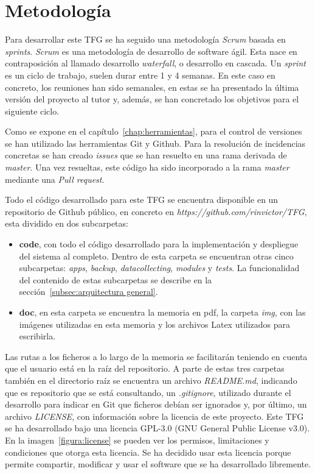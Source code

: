 \documentclass[a4paper, 12pt, oneside]{book}
\begin{document}
\section{Metodología}
\label{sec:Metodología}
Para desarrollar este TFG se ha seguido una metodología \textit{Scrum} basada en \textit{sprints}.
\textit{Scrum} es una metodología de desarrollo de software ágil. Esta nace en contraposición al llamado desarrollo \textit{waterfall}, o desarrollo en cascada. Un \textit{sprint} es un ciclo de trabajo, suelen durar entre 1 y 4 semanas.
En este caso en concreto, los reuniones han sido semanales, en estas se ha presentado la última versión del proyecto al tutor y, además, se han concretado los objetivos para el siguiente ciclo.

Como se expone en el capítulo~\ref{chap:herramientas}, para el control de versiones se han utilizado las herramientas Git y Github. Para la resolución de incidencias concretas se han creado \textit{issues} que se han resuelto en una rama derivada de \textit{master}. Una vez resueltas, este código ha sido incorporado a la rama \textit{master} mediante una \textit{Pull request}.

Todo el código desarrollado para este TFG se encuentra disponible en un repositorio de Github público, en concreto en \textit{https://github.com/rinvictor/TFG}, esta dividido en dos subcarpetas: 
\begin{itemize}
\item \textbf{code}, con todo el código desarrollado para la implementación y despliegue del sistema al completo. Dentro de esta carpeta se encuentran otras cinco subcarpetas: \textit{apps}, \textit{backup}, \textit{datacollecting}, \textit{modules} y \textit{tests}. La funcionalidad del contenido de estas subcarpetas se describe en la sección~\ref{subsec:arquitectura general}.

\item \textbf{doc}, en esta carpeta se encuentra la memoria en pdf, la carpeta \textit{img}, con las imágenes utilizadas en esta memoria y los archivos Latex utilizados para escribirla.
\end{itemize}

Las rutas a los ficheros a lo largo de la memoria se facilitarán teniendo en cuenta que el usuario está en la raíz del repositorio.
A parte de estas tres carpetas también en el directorio raíz se encuentra un archivo \textit{README.md}, indicando que es repositorio que se está consultando, un \textit{.gitignore}, utilizado durante el desarrollo para indicar en Git que ficheros debían ser ignorados y, por último, un archivo \textit{LICENSE}, con información sobre la licencia de este proyecto.
Este TFG se ha desarrollado bajo una licencia GPL-3.0 (GNU General Public License v3.0). En la imagen~\ref{figura:license} se pueden ver los permisos, limitaciones y condiciones que otorga esta licencia. Se ha decidido usar esta licencia porque permite compartir, modificar y usar el software que se ha desarrollado libremente.
\end{document}

